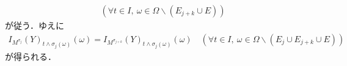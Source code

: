 \begin{prf}
\begin{description}
\begin{align}
					\quad (\forall t \in I,\ \omega \in \Omega \backslash (E_{j+k} \cup E))
				\end{align}
				が従う．ゆえに
				\begin{align}
					I_{M^{\sigma_j}}(Y)_{t \wedge \sigma_j(\omega)}(\omega) = I_{M^{\sigma_{j+k}}}(Y)_{t \wedge \sigma_j(\omega)}(\omega)
					\quad (\forall t \in I,\ \omega \in \Omega \backslash (E_j \cup E_{j+k} \cup E))
				\end{align}
				が得られる．
		\end{description}
		\QED
	\end{prf}
	